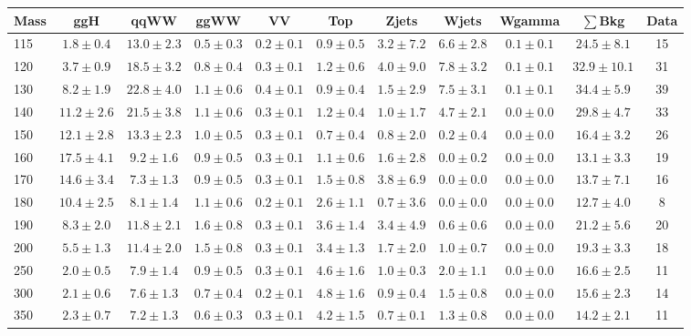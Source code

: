 \begin{table}
{\scriptsize
 \begin{center}
 \begin{tabular}{l c c c c c c c c c c }
 \hline
 Mass & ggH & qqWW & ggWW & VV & Top & Zjets & Wjets & Wgamma & $\sum$Bkg & Data \\
 \hline
115 & $1.8\pm0.4$ & $13.0\pm2.3$ & $0.5\pm0.3$ & $0.2\pm0.1$ & $0.9\pm0.5$ & $3.2\pm7.2$ & $6.6\pm2.8$ & $0.1\pm0.1$ & $24.5\pm8.1$ & 15 \\
120 & $3.7\pm0.9$ & $18.5\pm3.2$ & $0.8\pm0.4$ & $0.3\pm0.1$ & $1.2\pm0.6$ & $4.0\pm9.0$ & $7.8\pm3.2$ & $0.1\pm0.1$ & $32.9\pm10.1$ & 31 \\
130 & $8.2\pm1.9$ & $22.8\pm4.0$ & $1.1\pm0.6$ & $0.4\pm0.1$ & $0.9\pm0.4$ & $1.5\pm2.9$ & $7.5\pm3.1$ & $0.1\pm0.1$ & $34.4\pm5.9$ & 39 \\
140 & $11.2\pm2.6$ & $21.5\pm3.8$ & $1.1\pm0.6$ & $0.3\pm0.1$ & $1.2\pm0.4$ & $1.0\pm1.7$ & $4.7\pm2.1$ & $0.0\pm0.0$ & $29.8\pm4.7$ & 33 \\
150 & $12.1\pm2.8$ & $13.3\pm2.3$ & $1.0\pm0.5$ & $0.3\pm0.1$ & $0.7\pm0.4$ & $0.8\pm2.0$ & $0.2\pm0.4$ & $0.0\pm0.0$ & $16.4\pm3.2$ & 26 \\
160 & $17.5\pm4.1$ & $9.2\pm1.6$ & $0.9\pm0.5$ & $0.3\pm0.1$ & $1.1\pm0.6$ & $1.6\pm2.8$ & $0.0\pm0.2$ & $0.0\pm0.0$ & $13.1\pm3.3$ & 19 \\
170 & $14.6\pm3.4$ & $7.3\pm1.3$ & $0.9\pm0.5$ & $0.3\pm0.1$ & $1.5\pm0.8$ & $3.8\pm6.9$ & $0.0\pm0.0$ & $0.0\pm0.0$ & $13.7\pm7.1$ & 16 \\
180 & $10.4\pm2.5$ & $8.1\pm1.4$ & $1.1\pm0.6$ & $0.2\pm0.1$ & $2.6\pm1.1$ & $0.7\pm3.6$ & $0.0\pm0.0$ & $0.0\pm0.0$ & $12.7\pm4.0$ & 8 \\
190 & $8.3\pm2.0$ & $11.8\pm2.1$ & $1.6\pm0.8$ & $0.3\pm0.1$ & $3.6\pm1.4$ & $3.4\pm4.9$ & $0.6\pm0.6$ & $0.0\pm0.0$ & $21.2\pm5.6$ & 20 \\
200 & $5.5\pm1.3$ & $11.4\pm2.0$ & $1.5\pm0.8$ & $0.3\pm0.1$ & $3.4\pm1.3$ & $1.7\pm2.0$ & $1.0\pm0.7$ & $0.0\pm0.0$ & $19.3\pm3.3$ & 18 \\
250 & $2.0\pm0.5$ & $7.9\pm1.4$ & $0.9\pm0.5$ & $0.3\pm0.1$ & $4.6\pm1.6$ & $1.0\pm0.3$ & $2.0\pm1.1$ & $0.0\pm0.0$ & $16.6\pm2.5$ & 11 \\
300 & $2.1\pm0.6$ & $7.6\pm1.3$ & $0.7\pm0.4$ & $0.2\pm0.1$ & $4.8\pm1.6$ & $0.9\pm0.4$ & $1.5\pm0.8$ & $0.0\pm0.0$ & $15.6\pm2.3$ & 14 \\
350 & $2.3\pm0.7$ & $7.2\pm1.3$ & $0.6\pm0.3$ & $0.3\pm0.1$ & $4.2\pm1.5$ & $0.7\pm0.1$ & $1.3\pm0.8$ & $0.0\pm0.0$ & $14.2\pm2.1$ & 11 \\

\end{tabular}
\end{center}}
\end{table}
